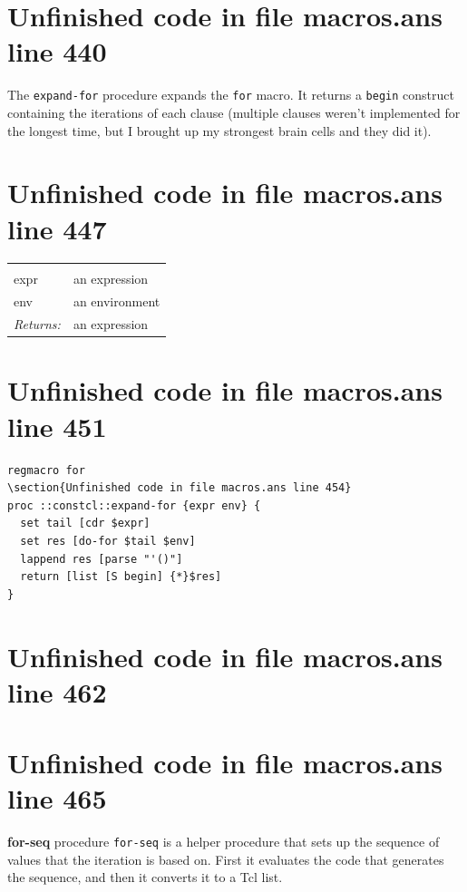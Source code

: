 \documentclass[twoside,9pt]{report}
\begin{document}
\section{Unfinished code in file macros.ans line 440}


The \texttt{expand-for} procedure expands the \texttt{for} macro. It returns a \texttt{begin} construct containing the iterations of each clause (multiple clauses weren't implemented for the longest time, but I brought up my strongest brain cells and they did it).

\section{Unfinished code in file macros.ans line 447}
\noindent\begin{tabular}{ |p{1.9cm} p{8cm}| }
\hline
\rowcolor[HTML]{CCCCCC} \multicolumn{2}{|l|}{\bf expand-for (internal)} \\
expr & an expression \\
env & an environment \\
\textit{Returns:} & an expression \\
\hline
\end{tabular}
\section{Unfinished code in file macros.ans line 451}
\begin{lstlisting}
regmacro for
\section{Unfinished code in file macros.ans line 454}
proc ::constcl::expand-for {expr env} {
  set tail [cdr $expr]
  set res [do-for $tail $env]
  lappend res [parse "'()"]
  return [list [S begin] {*}$res]
}
\end{lstlisting}
\section{Unfinished code in file macros.ans line 462}

\section{Unfinished code in file macros.ans line 465}

\textbf{for-seq} procedure \texttt{for-seq} is a helper procedure that sets up the sequence of values that the iteration is based on. First it evaluates the code that generates the sequence, and then it converts it to a Tcl list.
\end{document}
